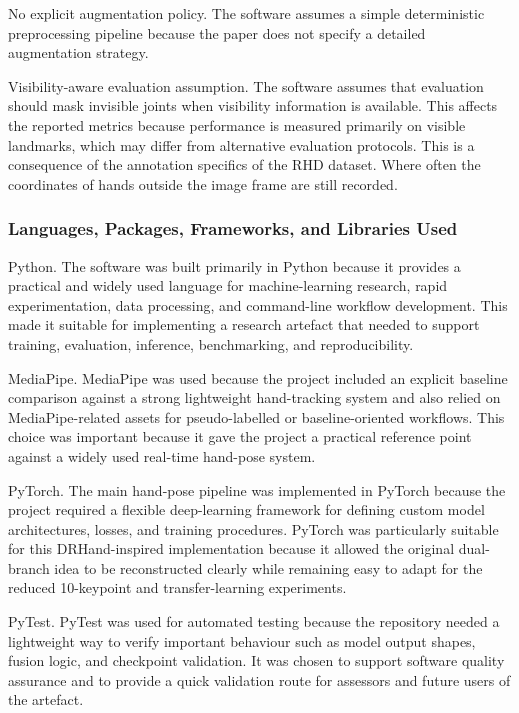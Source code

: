 ﻿\documentclass[11pt,a4paper]{article}
\begin{document}
\noindent
No explicit augmentation policy. The software assumes a simple deterministic
preprocessing pipeline because the paper does not specify a detailed
augmentation strategy.

\medskip

\noindent
Visibility-aware evaluation assumption. The software assumes that evaluation
should mask invisible joints when visibility information is available. This
affects the reported metrics because performance is measured primarily on
visible landmarks, which may differ from alternative evaluation protocols.
This is a consequence of the annotation specifics of the RHD dataset. Where
often the coordinates of hands outside the image frame are still recorded.

\subsubsection{Languages, Packages, Frameworks, and Libraries Used}

Python. The software was built primarily in Python because it provides a
practical and widely used language for machine-learning research, rapid
experimentation, data processing, and command-line workflow development. This
made it suitable for implementing a research artefact that needed to support
training, evaluation, inference, benchmarking, and reproducibility.

\medskip

\noindent
MediaPipe. MediaPipe was used because the project included an explicit
baseline comparison against a strong lightweight hand-tracking system and also
relied on MediaPipe-related assets for pseudo-labelled or baseline-oriented
workflows. This choice was important because it gave the project a practical
reference point against a widely used real-time hand-pose system.

\medskip

\noindent
PyTorch. The main hand-pose pipeline was implemented in PyTorch because the
project required a flexible deep-learning framework for defining custom model
architectures, losses, and training procedures. PyTorch was particularly
suitable for this DRHand-inspired implementation because it allowed the
original dual-branch idea to be reconstructed clearly while remaining easy to
adapt for the reduced 10-keypoint and transfer-learning experiments.

\medskip

\noindent
PyTest. PyTest was used for automated testing because the repository needed a
lightweight way to verify important behaviour such as model output shapes,
fusion logic, and checkpoint validation. It was chosen to support software
quality assurance and to provide a quick validation route for assessors and
future users of the artefact.
\end{document}
